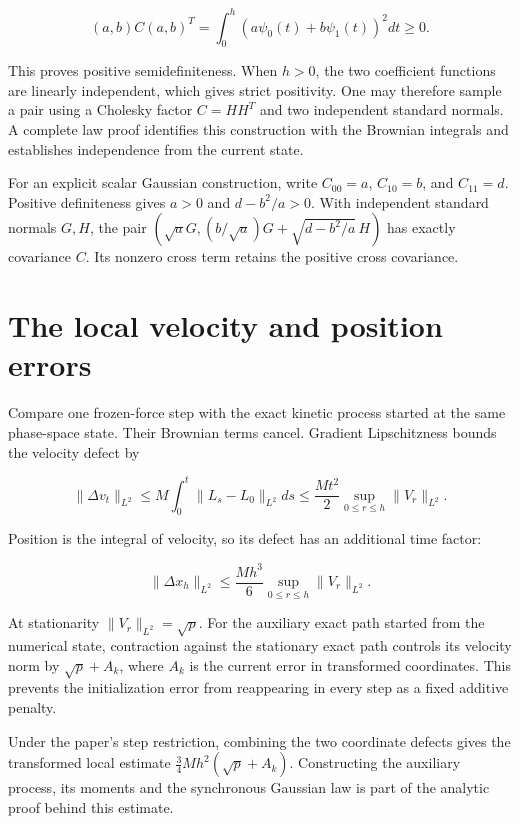 \documentclass[11pt,a4paper]{report}
\begin{document}
\[(a,b)C(a,b)^T=\int_0^h(a\psi_0(t)+b\psi_1(t))^2dt\ge0.\]


This proves positive semidefiniteness. When \(h>0\), the two coefficient
functions are linearly independent, which gives strict positivity. One may
therefore sample a pair using a Cholesky factor \(C=HH^T\) and two independent
standard normals. A complete law proof identifies this construction with the
Brownian integrals and establishes independence from the current state.



For an explicit scalar Gaussian construction, write \(C_{00}=a\), \(C_{10}=b\), and \(C_{11}=d\). Positive definiteness gives \(a>0\) and \(d-b^2/a>0\). With independent standard normals \(G,H\), the pair \((\sqrt aG,(b/\sqrt a)G+\sqrt{d-b^2/a}\,H)\) has exactly covariance \(C\). Its nonzero cross term retains the positive cross covariance.

\section{\texorpdfstring{The local velocity and position errors}{The local velocity and position errors}}


Compare one frozen-force step with the exact kinetic process started at
the same phase-space state. Their Brownian terms cancel. Gradient Lipschitzness
bounds the velocity defect by


\[\|\Delta v_t\|_{L^2}
\le M\int_0^t\|L_s-L_0\|_{L^2}ds
\le\frac{Mt^2}{2}\sup_{0\le r\le h}\|V_r\|_{L^2}.\]


Position is the integral of velocity, so its defect has an additional time
factor:


\[\|\Delta x_h\|_{L^2}\le\frac{Mh^3}{6}
\sup_{0\le r\le h}\|V_r\|_{L^2}.\]


At stationarity \(\|V_r\|_{L^2}=\sqrt p\). For the auxiliary exact path
started from the numerical state, contraction against the stationary exact
path controls its velocity norm by \(\sqrt p+A_k\), where \(A_k\) is the
current error in transformed coordinates. This prevents the initialization
error from reappearing in every step as a fixed additive penalty.




Under the paper's step restriction, combining the two coordinate defects
gives the transformed local estimate
\(\tfrac34Mh^2(\sqrt p+A_k)\). Constructing the auxiliary process, its
moments and the synchronous Gaussian law is part of the analytic proof behind
this estimate.
\end{document}
